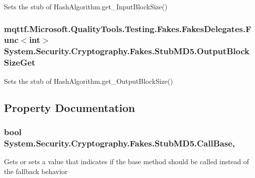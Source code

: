 Sets the stub of Hash\-Algorithm.\-get\-\_\-\-Input\-Block\-Size()

\hypertarget{class_system_1_1_security_1_1_cryptography_1_1_fakes_1_1_stub_m_d5_af35dec16bb238b73c9f297bb8965ab9e}{
\subsubsection[{Output\-Block\-Size\-Get}]{\setlength{\rightskip}{0pt plus 5cm}mqttf.\-Microsoft.\-Quality\-Tools.\-Testing.\-Fakes.\-Fakes\-Delegates.\-Func$<$int$>$ System.\-Security.\-Cryptography.\-Fakes.\-Stub\-M\-D5.\-Output\-Block\-Size\-Get}}\label{class_system_1_1_security_1_1_cryptography_1_1_fakes_1_1_stub_m_d5_af35dec16bb238b73c9f297bb8965ab9e}


Sets the stub of Hash\-Algorithm.\-get\-\_\-\-Output\-Block\-Size()



\subsection{Property Documentation}
\hypertarget{class_system_1_1_security_1_1_cryptography_1_1_fakes_1_1_stub_m_d5_a4a3406063648adf2e8d0b732300f113a}{
\subsubsection[{Call\-Base}]{\setlength{\rightskip}{0pt plus 5cm}bool System.\-Security.\-Cryptography.\-Fakes.\-Stub\-M\-D5.\-Call\-Base\hspace{0.3cm}{\ttfamily [get]}, {\ttfamily [set]}}}\label{class_system_1_1_security_1_1_cryptography_1_1_fakes_1_1_stub_m_d5_a4a3406063648adf2e8d0b732300f113a}


Gets or sets a value that indicates if the base method should be called instead of the fallback behavior

